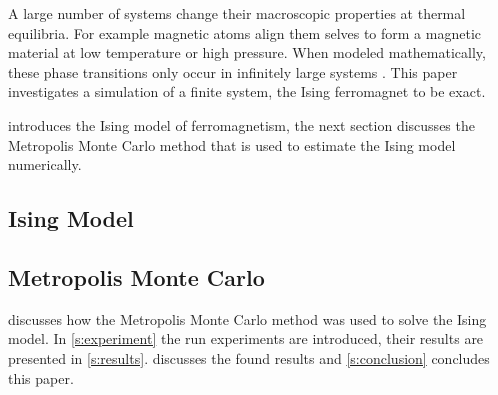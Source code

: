 A large number of systems change their macroscopic properties at thermal equilibria. For example magnetic atoms align them selves to form a magnetic material at low temperature or high pressure. When modeled mathematically, these phase transitions only occur in infinitely large systems \cite{kenzel1997physics}. This paper investigates a simulation of a finite system, the Ising ferromagnet to be exact.

 introduces the Ising model of ferromagnetism, the next section discusses the Metropolis Monte Carlo method that is used to estimate the Ising model numerically.

\subsection{Ising Model}
	\label{ss:intro:ising}
	

\subsection{Metropolis Monte Carlo}
	\label{ss:intro:mmc}
	

 discusses how the Metropolis Monte Carlo method was used to solve the Ising model. In \cref{s:experiment} the run experiments are introduced, their results are presented in \cref{s:results}.  discusses the found results and \cref{s:conclusion} concludes this paper.